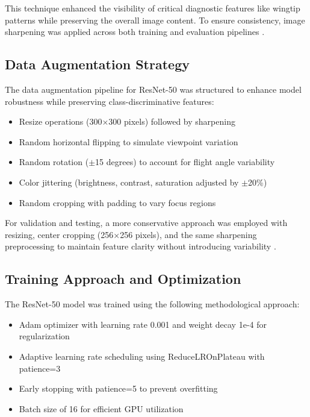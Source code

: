 \documentclass[a4paper,12pt]{article}
\begin{document}
This technique enhanced the visibility of critical diagnostic features like wingtip patterns while preserving the overall image content. To ensure consistency, image sharpening was applied across both training and evaluation pipelines \citep{zhao2021image}.

\subsection{Data Augmentation Strategy}

The data augmentation pipeline for ResNet-50 was structured to enhance model robustness while preserving class-discriminative features:

\begin{itemize}
    \item Resize operations (300$\times$300 pixels) followed by sharpening
    \item Random horizontal flipping to simulate viewpoint variation
    \item Random rotation ($\pm$15 degrees) to account for flight angle variability
    \item Color jittering (brightness, contrast, saturation adjusted by $\pm$20\%)
    \item Random cropping with padding to vary focus regions
\end{itemize}

For validation and testing, a more conservative approach was employed with resizing, center cropping (256$\times$256 pixels), and the same sharpening preprocessing to maintain feature clarity without introducing variability \citep{shorten2019survey}.

\subsection{Training Approach and Optimization}

The ResNet-50 model was trained using the following methodological approach:

\begin{itemize}
    \item Adam optimizer with learning rate 0.001 and weight decay 1e-4 for regularization
    \item Adaptive learning rate scheduling using ReduceLROnPlateau with patience=3
    \item Early stopping with patience=5 to prevent overfitting
    \item Batch size of 16 for efficient GPU utilization
\end{itemize}
\end{document}
